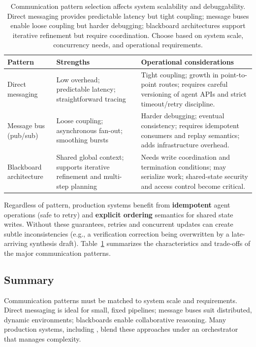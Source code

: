 \begin{table}[t]
\centering
\small
\caption{Communication pattern selection affects system scalability and debuggability. Direct messaging provides predictable latency but tight coupling; message buses enable loose coupling but harder debugging; blackboard architectures support iterative refinement but require coordination. Choose based on system scale, concurrency needs, and operational requirements.}
\label{tab:ch09_comm_patterns}
\setlength{\tabcolsep}{6pt}
\renewcommand{\arraystretch}{1.3}
\begin{tabularx}{\linewidth}{@{}p{3.2cm}p{3.4cm}X@{}}
\toprule
\rowcolor{gray!15}
\textbf{Pattern} & \textbf{Strengths} & \textbf{Operational considerations} \\
\midrule
Direct messaging &
Low overhead; predictable latency; straightforward tracing &
Tight coupling; growth in point-to-point routes; requires careful versioning of agent APIs and strict timeout/retry discipline. \\
Message bus (pub/sub) &
Loose coupling; asynchronous fan-out; smoothing bursts &
Harder debugging; eventual consistency; requires idempotent consumers and replay semantics; adds infrastructure overhead. \\
Blackboard architecture &
Shared global context; supports iterative refinement and multi-step planning &
Needs write coordination and termination conditions; may serialize work; shared-state security and access control become critical. \\
\bottomrule
\end{tabularx}
\end{table}

\noindent Regardless of pattern, production systems benefit from \textbf{idempotent} agent operations (safe to retry) and \textbf{explicit ordering} semantics for shared state writes.
Without these guarantees, retries and concurrent updates can create subtle inconsistencies (e.g., a verification correction being overwritten by a late-arriving synthesis draft). Table~\ref{tab:ch09_comm_patterns} summarizes the characteristics and trade-offs of the major communication patterns.



\subsection*{Summary}
Communication patterns must be matched to system scale and requirements. Direct messaging is ideal for small, fixed pipelines; message buses suit distributed, dynamic environments; blackboards enable collaborative reasoning. Many production systems, including \ishtar{}, blend these approaches under an orchestrator that manages complexity.  

